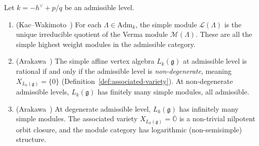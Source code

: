 \begin{theorem}
\label{thm:admissible-rep-theory}
Let $k = -h^\vee + p/q$ be an admissible level.
\begin{enumerate}[label=\textup{(\roman*)}]
\item \textup{(}Kac--Wakimoto~\cite{KW88}\textup{)}
  For each $\Lambda \in \mathrm{Adm}_k$, the simple module
  $\mathcal{L}(\Lambda)$ is the unique irreducible quotient of
  the Verma module $\mathcal{M}(\Lambda)$.  These are all the
  simple highest weight modules in the admissible category.
\item \textup{(}Arakawa~\cite{Arakawa17}\textup{)}
  The simple affine vertex algebra $L_k(\mathfrak{g})$ at
  admissible level is rational if and only if the admissible level
  is \emph{non-degenerate}, meaning $X_{L_k(\mathfrak{g})} = \{0\}$
  \textup{(}Definition~\textup{\ref{def:associated-variety})}.
  At non-degenerate admissible levels, $L_k(\mathfrak{g})$ has
  finitely many simple modules, all admissible.
\item \textup{(}Arakawa~\cite{Arakawa17}\textup{)}
  At degenerate admissible level, $L_k(\mathfrak{g})$ has
  infinitely many simple modules.  The associated variety
  $X_{L_k(\mathfrak{g})} = \overline{\mathbb{O}}$ is a non-trivial
  nilpotent orbit closure, and the module category has
  logarithmic (non-semisimple) structure.
\end{enumerate}
\end{theorem}

